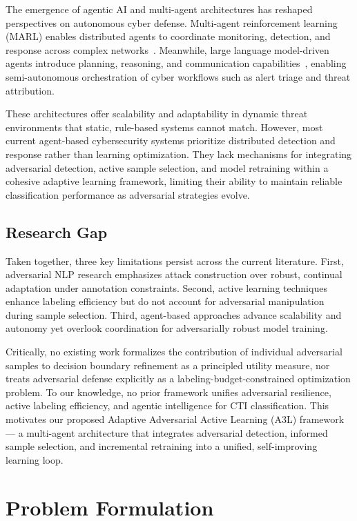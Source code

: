 \documentclass[review,1p,times,number]{elsarticle}
\begin{document}
The emergence of agentic AI and multi-agent architectures has reshaped
perspectives on autonomous cyber defense. Multi-agent reinforcement
learning (MARL) enables distributed agents to coordinate monitoring,
detection, and response across complex
networks~\cite{finistrella2025marl}. Meanwhile, large language
model-driven agents introduce planning, reasoning, and communication
capabilities~\cite{xi2023rise, wang2024agents}, enabling
semi-autonomous orchestration of cyber workflows such as alert triage
and threat attribution.

These architectures offer scalability and adaptability in dynamic
threat environments that static, rule-based systems cannot match.
However, most current agent-based cybersecurity systems prioritize
distributed detection and response rather than learning optimization.
They lack mechanisms for integrating adversarial detection, active
sample selection, and model retraining within a cohesive adaptive
learning framework, limiting their ability to maintain reliable
classification performance as adversarial strategies evolve.

\subsection{Research Gap}

Taken together, three key limitations persist across the current
literature. First, adversarial NLP research emphasizes attack
construction over robust, continual adaptation under annotation
constraints. Second, active learning techniques enhance labeling
efficiency but do not account for adversarial manipulation during
sample selection. Third, agent-based approaches advance scalability
and autonomy yet overlook coordination for adversarially robust model
training.

Critically, no existing work formalizes the contribution of individual
adversarial samples to decision boundary refinement as a principled
utility measure, nor treats adversarial defense explicitly as a
labeling-budget-constrained optimization problem. To our knowledge,
no prior framework unifies adversarial resilience, active labeling
efficiency, and agentic intelligence for CTI classification. This
motivates our proposed Adaptive Adversarial Active Learning
(A3L) framework — a multi-agent architecture that integrates
adversarial detection, informed sample selection, and incremental
retraining into a unified, self-improving learning loop.
\section{Problem Formulation}
\label{sec:problem}
\end{document}
